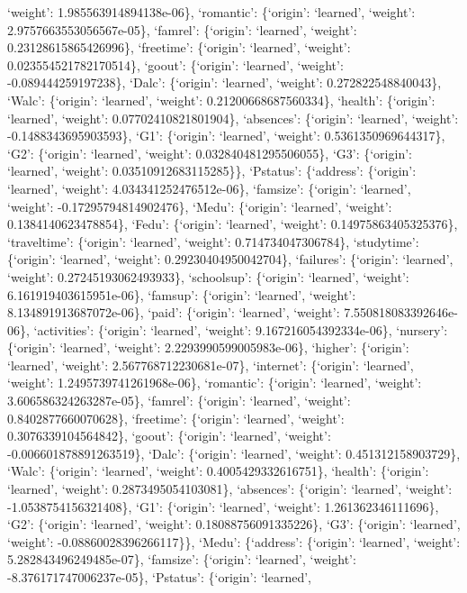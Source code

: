 \documentclass[
]{article}
\begin{document}
`weight': 1.985563914894138e-06\}, `romantic': \{`origin': `learned',
`weight': 2.9757663553056567e-05\}, `famrel': \{`origin': `learned',
`weight': 0.23128615865426996\}, `freetime': \{`origin': `learned',
`weight': 0.023554521782170514\}, `goout': \{`origin': `learned',
`weight': -0.089444259197238\}, `Dalc': \{`origin': `learned', `weight':
0.272822548840043\}, `Walc': \{`origin': `learned', `weight':
0.21200668687560334\}, `health': \{`origin': `learned', `weight':
0.07702410821801904\}, `absences': \{`origin': `learned', `weight':
-0.1488343695903593\}, `G1': \{`origin': `learned', `weight':
0.5361350969644317\}, `G2': \{`origin': `learned', `weight':
0.032840481295506055\}, `G3': \{`origin': `learned', `weight':
0.03510912683115285\}\}, `Pstatus': \{`address': \{`origin': `learned',
`weight': 4.034341252476512e-06\}, `famsize': \{`origin': `learned',
`weight': -0.17295794814902476\}, `Medu': \{`origin': `learned',
`weight': 0.1384140623478854\}, `Fedu': \{`origin': `learned', `weight':
0.14975863405325376\}, `traveltime': \{`origin': `learned', `weight':
0.714734047306784\}, `studytime': \{`origin': `learned', `weight':
0.29230404950042704\}, `failures': \{`origin': `learned', `weight':
0.27245193062493933\}, `schoolsup': \{`origin': `learned', `weight':
6.161919403615951e-06\}, `famsup': \{`origin': `learned', `weight':
8.134891913687072e-06\}, `paid': \{`origin': `learned', `weight':
7.550818083392646e-06\}, `activities': \{`origin': `learned', `weight':
9.167216054392334e-06\}, `nursery': \{`origin': `learned', `weight':
2.2293990599005983e-06\}, `higher': \{`origin': `learned', `weight':
2.567768712230681e-07\}, `internet': \{`origin': `learned', `weight':
1.2495739741261968e-06\}, `romantic': \{`origin': `learned', `weight':
3.606586324263287e-05\}, `famrel': \{`origin': `learned', `weight':
0.8402877660070628\}, `freetime': \{`origin': `learned', `weight':
0.3076339104564842\}, `goout': \{`origin': `learned', `weight':
-0.006601878891263519\}, `Dalc': \{`origin': `learned', `weight':
0.451312158903729\}, `Walc': \{`origin': `learned', `weight':
0.4005429332616751\}, `health': \{`origin': `learned', `weight':
0.2873495054103081\}, `absences': \{`origin': `learned', `weight':
-1.0538754156321408\}, `G1': \{`origin': `learned', `weight':
1.261362346111696\}, `G2': \{`origin': `learned', `weight':
0.18088756091335226\}, `G3': \{`origin': `learned', `weight':
-0.08860028396266117\}\}, `Medu': \{`address': \{`origin': `learned',
`weight': 5.282843496249485e-07\}, `famsize': \{`origin': `learned',
`weight': -8.376171747006237e-05\}, `Pstatus': \{`origin': `learned',
\end{document}
